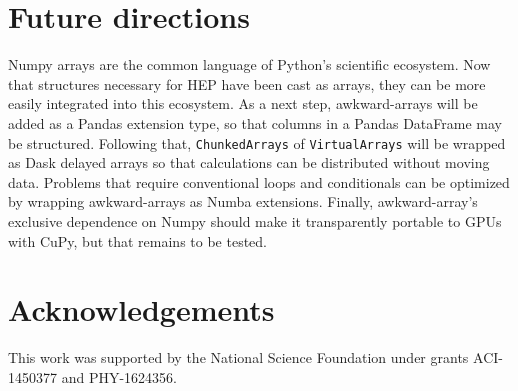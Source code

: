 \documentclass{webofc}
\begin{document}
\section{Future directions}

Numpy arrays are the common language of Python's scientific ecosystem. Now that structures necessary for HEP have been cast as arrays, they can be more easily integrated into this ecosystem. As a next step, awkward-arrays will be added as a Pandas extension type, so that columns in a Pandas DataFrame may be structured. Following that, {\tt\small ChunkedArrays} of {\tt\small VirtualArrays} will be wrapped as Dask delayed arrays so that calculations can be distributed without moving data. Problems that require conventional loops and conditionals can be optimized by wrapping awkward-arrays as Numba extensions. Finally, awkward-array's exclusive dependence on Numpy should make it transparently portable to GPUs with CuPy, but that remains to be tested.

\section{Acknowledgements}

This work was supported by the National Science Foundation under grants ACI-1450377 and PHY-1624356.
\end{document}
